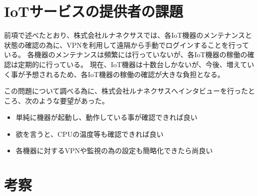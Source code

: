 \section{IoTサービスの提供者の課題}
前項で述べたとおり、株式会社ルナネクサスでは、各IoT機器のメンテナンスと状態の確認の為に、VPNを利用して遠隔から手動でログインすることを行っている。
各機器のメンテナンスは頻繁には行っていないが、各IoT機器の稼働の確認は定期的に行っている。
現在、IoT機器は十数台しかないが、今後、増えていく事が予想されるため、各IoT機器の稼働の確認が大きな負担となる。

この問題について調べる為に、株式会社ルナネクサスへインタビューを行ったところ、次のような要望があった。
\begin{itemize}
\item 単純に機器が起動し、動作している事が確認できれば良い
\item 欲を言うと、CPUの温度等も確認できれば良い
\item 各機器に対するVPNや監視の為の設定も簡略化できたら尚良い
\end{itemize}

\section{考察}

